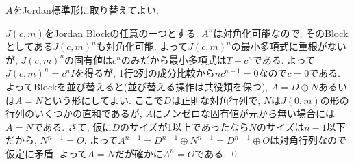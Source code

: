 {\begin{probans}
$A$をJordan標準形に取り替えてよい.\par  $J(c,m)$をJordan Blockの任意の一つとする.  $A^n$は対角化可能なので, そのBlockとしてある$J(c,m)^n$も対角化可能. よって$J(c,m)^n$の最小多項式に重根がないが, $J(c,m)^n$の固有値は$c^n$のみだから最小多項式は$T-c^n$である. よって$J(c,m)^n = c^n I$を得るが, 1行2列の成分比較から$nc^{n-1}=0$なので$c=0$である. よってBlockを並び替えると(並び替える操作は共役類を保つ), $A=D \oplus N$あるいは$A=N$という形にしてよい. ここで$D$は正則な対角行列で, $N$は$J(0,m)$の形の行列のいくつかの直和であるが, $A$にノンゼロな固有値が元から無い場合には$A=N$である. さて, 仮に$D$のサイズが1以上であったなら$N$のサイズは$n-1$以下だから, $N^{n-1} = O$. よって$A^{n-1} = D^{n-1}\oplus N^{n-1} = D^{n-1}\oplus O$は対角行列なので仮定に矛盾. よって$A=N$だが確かに$A^n = O$である. \qed \\
\end{probans}

}




\clearpage
